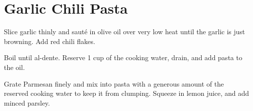 \section{Garlic Chili Pasta}
\begin{recipe}



Slice garlic thinly and sauté in olive oil over very low heat until the garlic is just browning. Add red chili flakes.


Boil until al-dente. Reserve 1 cup of the cooking water, drain, and add pasta to the oil.



Grate Parmesan finely and mix into pasta with a generous amount of the reserved cooking water to keep it from clumping. Squeeze in lemon juice, and add minced parsley.

\end{recipe}
